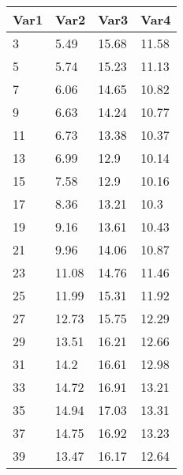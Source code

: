 \begin{tabular}{llll}
Var1 & Var2 & Var3 & Var4 \\ 
\hline 
3 & 5.49 & 15.68 & 11.58 \\ 
5 & 5.74 & 15.23 & 11.13 \\ 
7 & 6.06 & 14.65 & 10.82 \\ 
9 & 6.63 & 14.24 & 10.77 \\ 
11 & 6.73 & 13.38 & 10.37 \\ 
13 & 6.99 & 12.9 & 10.14 \\ 
15 & 7.58 & 12.9 & 10.16 \\ 
17 & 8.36 & 13.21 & 10.3 \\ 
19 & 9.16 & 13.61 & 10.43 \\ 
21 & 9.96 & 14.06 & 10.87 \\ 
23 & 11.08 & 14.76 & 11.46 \\ 
25 & 11.99 & 15.31 & 11.92 \\ 
27 & 12.73 & 15.75 & 12.29 \\ 
29 & 13.51 & 16.21 & 12.66 \\ 
31 & 14.2 & 16.61 & 12.98 \\ 
33 & 14.72 & 16.91 & 13.21 \\ 
35 & 14.94 & 17.03 & 13.31 \\ 
37 & 14.75 & 16.92 & 13.23 \\ 
39 & 13.47 & 16.17 & 12.64 \\ 
\hline 
\end{tabular}
